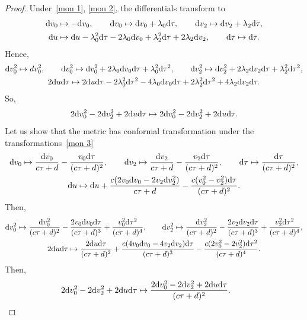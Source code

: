 \documentclass[10pt,a4paper]{amsart}
\numberwithin{equation}{section}
\begin{document}
\begin{proof}Under~\eqref{mon 1}, \eqref{mon 2}, the differentials transform to
\begin{gather*}
{\rm d}v_0\mapsto-{\rm d}v_0,\qquad
{\rm d}v_0\mapsto {\rm d}v_0+\lambda_0{\rm d}\tau,\qquad
{\rm d}v_2\mapsto {\rm d}v_2+\lambda_2{\rm d}\tau,\\
{\rm d}u\mapsto {\rm d}u-\lambda_0^2{\rm d}\tau-2\lambda_0{\rm d}v_0+\lambda_2^2{\rm d}\tau+2\lambda_2{\rm d}v_2,\qquad
{\rm d}\tau\mapsto {\rm d}\tau.
\end{gather*}
Hence,
\begin{gather*}
{\rm d}v_0^2\mapsto dv^2_0,\qquad
{\rm d}v_0^2\mapsto {\rm d}v_0^2+2\lambda_0{\rm d}v_0{\rm d}\tau+\lambda_0^2{\rm d}\tau^2,\qquad
{\rm d}v_2^2\mapsto {\rm d}v_2^2+2\lambda_2{\rm d}v_2{\rm d}\tau+\lambda_2^2{\rm d}\tau^2,\\
2{\rm d}u {\rm d}\tau\mapsto 2{\rm d}u {\rm d}\tau-2\lambda_0^2{\rm d}\tau^2-4\lambda_0{\rm d}v_0{\rm d}\tau+2\lambda_2^2{\rm d}\tau^2+4\lambda_2{\rm d}v_2{\rm d}\tau.
\end{gather*}
So,
\begin{gather*}
2{\rm d}v_0^2-2{\rm d}v_2^2+2{\rm d}u {\rm d}\tau\mapsto 2{\rm d}v_0^2-2{\rm d}v_2^2+2{\rm d}u {\rm d}\tau.
\end{gather*}
Let us show that the metric has conformal transformation under the transformations~\eqref{mon 3}
\begin{gather*}
{\rm d}v_0\mapsto \frac{{\rm d}v_0}{c\tau+d}-\frac{v_0{\rm d}\tau}{(c\tau+d)^2},\qquad
{\rm d}v_2\mapsto \frac{{\rm d}v_2}{c\tau+d}-\frac{v_2{\rm d}\tau}{(c\tau+d)^2},\qquad
{\rm d}\tau\mapsto \frac{{\rm d}\tau}{(c\tau+d)^2},\\
{\rm d}u\mapsto {\rm d}u+\frac{c(2v_0{\rm d}v_0-2v_2{\rm d}v_2^2)}{c\tau+d}-\frac{c(v_0^2-v_2^2){\rm d}\tau}{(c\tau+d)^2}.
\end{gather*}
Then,
\begin{gather*}
{\rm d}v_0^2\mapsto \frac{{\rm d}v_0^2}{(c\tau+d)^2}-\frac{2v_0{\rm d}v_0{\rm d}\tau}{(c\tau+d)^3}+\frac{v_0^2{\rm d}\tau^2}{(c\tau+d)^4},\qquad
{\rm d}v_2^2\mapsto \frac{{\rm d}v_2^2}{(c\tau+d)^2}-\frac{2v_2{\rm d}v_2{\rm d}\tau}{(c\tau+d)^3}+\frac{v_2^2{\rm d}\tau^2}{(c\tau+d)^4},\\
2{\rm d}u {\rm d}\tau \mapsto \frac{2{\rm d}u {\rm d}\tau}{(c\tau+d)^2}+\frac{c(4v_0{\rm d}v_0-4v_2{\rm d}v_2){\rm d}\tau}{(c\tau+d)^3}-\frac{c(2v_0^2-2v_2^2){\rm d}\tau^2}{(c\tau+d)^4}.
\end{gather*}
Then,
\begin{gather*}
2{\rm d}v_0^2-2{\rm d}v_2^2+2{\rm d}u {\rm d}\tau\mapsto \frac{2{\rm d}v_0^2-2{\rm d}v_2^2+2{\rm d}u {\rm d}\tau}{(c\tau+d)^2}.
\tag*{\qed}
\end{gather*}
\renewcommand{\qed}{}
\end{proof}
\end{document}
